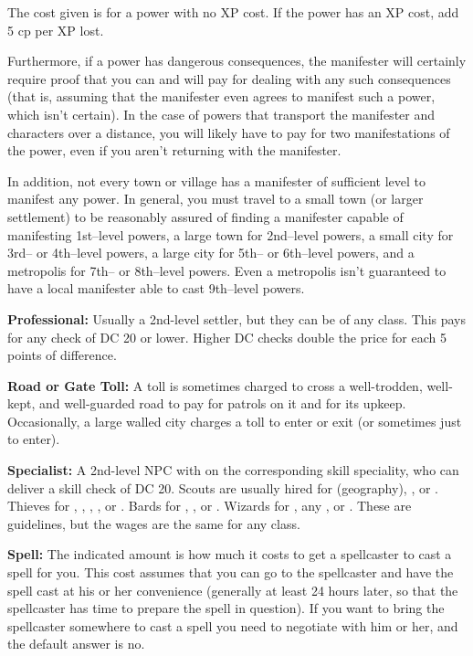 The cost given is for a power with no XP cost. If the power has an XP cost, add 5 cp per XP lost.

Furthermore, if a power has dangerous consequences, the manifester will certainly require proof that you can and will pay for dealing with any such consequences (that is, assuming that the manifester even agrees to manifest such a power, which isn't certain). In the case of powers that transport the manifester and characters over a distance, you will likely have to pay for two manifestations of the power, even if you aren't returning with the manifester.

In addition, not every town or village has a manifester of sufficient level to manifest any power. In general, you must travel to a small town (or larger settlement) to be reasonably assured of finding a manifester capable of manifesting 1st--level powers, a large town for 2nd--level powers, a small city for 3rd-- or 4th--level powers, a large city for 5th-- or 6th--level powers, and a metropolis for 7th-- or 8th--level powers. Even a metropolis isn't guaranteed to have a local manifester able to cast 9th--level powers.

\textbf{Professional:} Usually a 2nd-level settler, but they can be of any class. This pays for any  check of DC 20 or lower. Higher DC checks double the price for each 5 points of difference.

\textbf{Road or Gate Toll:} A toll is sometimes charged to cross a well-trodden, well-kept, and well-guarded road to pay for patrols on it and for its upkeep. Occasionally, a large walled city charges a toll to enter or exit (or sometimes just to enter).

\textbf{Specialist:} A 2nd-level NPC with  on the corresponding skill speciality, who can deliver a skill check of DC 20. Scouts are usually hired for  (geography), , or . Thieves for , , , , or . Bards for , , or . Wizards for , any , or . These are guidelines, but the wages are the same for any class.

\textbf{Spell:} The indicated amount is how much it costs to get a spellcaster to cast a spell for you. This cost assumes that you can go to the spellcaster and have the spell cast at his or her convenience (generally at least 24 hours later, so that the spellcaster has time to prepare the spell in question). If you want to bring the spellcaster somewhere to cast a spell you need to negotiate with him or her, and the default answer is no.

